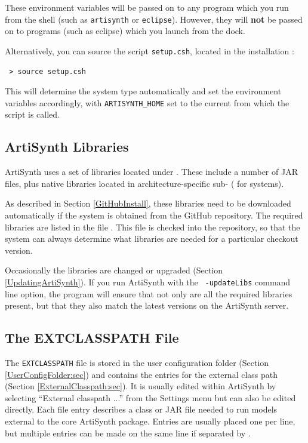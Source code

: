 These environment variables will be passed on to any program which you
run from the shell (such as {\tt artisynth} or {\tt eclipse}).
\ifMacOS
However, they will {\bf not} be passed on to programs (such as eclipse)
which you launch from the dock.
\fi

Alternatively, you can source the script {\tt setup.csh}, located in
the installation \directory{}:

\begin{verbatim}
 > source setup.csh
\end{verbatim}

This will determine the system type automatically and set the
environment variables accordingly, with {\tt ARTISYNTH\_HOME} set to the
current \directory{} from which the script is called.
\fi %

\subsection{ArtiSynth Libraries}

ArtiSynth uses a set of libraries located under
.  These include a number of JAR
files, plus native libraries located in architecture-specific
sub-\directories{} ({\tt \ARCH{}} for \FULLSYSTEM{} systems).

As described in Section \ref{GitHubInstall}, these libraries
need to be downloaded automatically if the system is obtained from the
GitHub repository. The required libraries are listed in the file
. This file is checked
into the repository, so that the system can always determine what
libraries are needed for a particular checkout version.

Occasionally the libraries are changed or upgraded
(Section \ref{UpdatingArtiSynth}).  If you run ArtiSynth with the {\tt
-updateLibs} command line option, the program will ensure that not
only are all the required libraries present, but that they also match
the latest versions on the ArtiSynth server.

\subsection{The EXTCLASSPATH File}
\label{EXTCLASSPATHFile}

The {\tt EXTCLASSPATH} file is stored in the user configuration folder
(Section \ref{UserConfigFolder:sec}) and contains the entries for the
external class path (Section \ref{ExternalClasspath:sec}).  It is
usually edited within ArtiSynth by selecting {\sf ``External classpath
...''} from the {\sf Settings} menu but can also be edited directly.
Each file entry describes a class \directory{} or JAR file needed to
run models external to the core ArtiSynth package.  Entries are
usually placed one per line, but multiple entries can be made on the
same line if separated by \separatorDesc{}.

